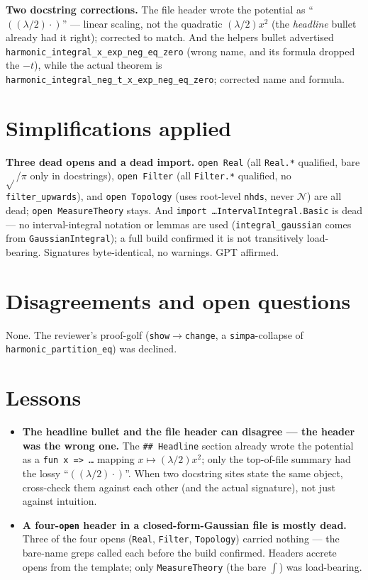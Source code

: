 \documentclass[11pt]{article}
\begin{document}
\textbf{Two docstring corrections.} The file header wrote the potential as ``$((\lambda/2)\cdot)$''
--- linear scaling, not the quadratic $(\lambda/2)x^2$ (the \emph{headline} bullet already had it
right); corrected to match. And the helpers bullet advertised
\texttt{harmonic\_integral\_x\_exp\_neg\_eq\_zero} (wrong name, and its formula dropped the $-t$),
while the actual theorem is \texttt{harmonic\_integral\_neg\_t\_x\_exp\_neg\_eq\_zero}; corrected
name and formula.

\section{Simplifications applied}
\textbf{Three dead opens and a dead import.} \texttt{open Real} (all \texttt{Real.*} qualified,
bare $\sqrt{}$/$\pi$ only in docstrings), \texttt{open Filter} (all \texttt{Filter.*} qualified, no
\texttt{filter\_upwards}), and \texttt{open Topology} (uses root-level \texttt{nhds}, never $\mathcal
N$) are all dead; \texttt{open MeasureTheory} stays. And \texttt{import
\dots IntervalIntegral.Basic} is dead --- no interval-integral notation or lemmas are used
(\texttt{integral\_gaussian} comes from \texttt{GaussianIntegral}); a full build confirmed it is not
transitively load-bearing. Signatures byte-identical, no warnings. GPT affirmed.

\section{Disagreements and open questions}
None. The reviewer's proof-golf (\texttt{show}$\to$\texttt{change}, a \texttt{simpa}-collapse of
\texttt{harmonic\_partition\_eq}) was declined.

\section{Lessons}
\begin{itemize}[noitemsep]
  \item \textbf{The headline bullet and the file header can disagree --- the header was the wrong
    one.} The \texttt{\#\# Headline} section already wrote the potential as
    a \texttt{fun x => \dots} mapping $x\mapsto(\lambda/2)x^2$; only the top-of-file summary had the
    lossy ``$((\lambda/2)\cdot)$''.
    When two docstring sites state the same object, cross-check them against each other (and the
    actual signature), not just against intuition.
  \item \textbf{A four-\texttt{open} header in a closed-form-Gaussian file is mostly dead.} Three of
    the four opens (\texttt{Real}, \texttt{Filter}, \texttt{Topology}) carried nothing --- the
    bare-name greps called each before the build confirmed. Headers accrete opens from the template;
    only \texttt{MeasureTheory} (the bare $\int$) was load-bearing.
\end{itemize}
\end{document}

